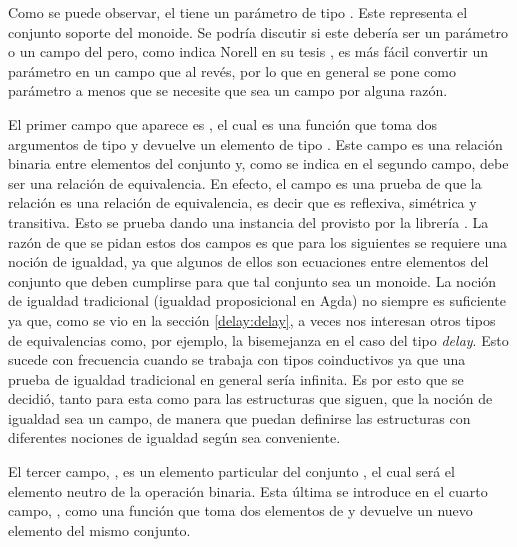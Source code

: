 
Como se puede observar, el   tiene un parámetro  de tipo . Este representa el conjunto soporte del monoide. Se podría discutir si este debería ser un parámetro o un campo del  pero, como indica Norell en su tesis \cite{norell:thesis}, es más fácil convertir un parámetro en un campo que al revés, por lo que en general se pone como parámetro a menos que se necesite que sea un campo por alguna razón.

El primer campo que aparece es , el cual es una función que toma dos argumentos de tipo  y devuelve un elemento de tipo . Este campo es una relación binaria entre elementos del conjunto  y, como se indica en el segundo campo, debe ser una relación de equivalencia. En efecto, el campo  es una prueba de que la relación  es una relación de equivalencia, es decir que es reflexiva, simétrica y transitiva. Esto se prueba dando una instancia del   provisto por la librería  \href{https://agda.github.io/agda-stdlib/Relation.Binary.Structures.html}{}. La razón de que se pidan estos dos campos es que para los siguientes se requiere una noción de igualdad, ya que algunos de ellos son ecuaciones entre elementos del conjunto  que deben cumplirse para que tal conjunto sea un monoide. La noción de igualdad tradicional (igualdad proposicional en Agda) no siempre es suficiente ya que, como se vio en la sección \ref{delay:delay}, a veces nos interesan otros tipos de equivalencias como, por ejemplo, la bisemejanza en el caso del tipo \textit{delay}. Esto sucede con frecuencia cuando se trabaja con tipos coinductivos ya que una prueba de igualdad tradicional en general sería infinita. Es por esto que se decidió, tanto para esta como para las estructuras que siguen, que la noción de igualdad sea un campo, de manera que puedan definirse las estructuras con diferentes nociones de igualdad según sea conveniente. 

El tercer campo, , es un elemento particular del conjunto , el cual será el elemento neutro de la operación binaria. Esta última se introduce en el cuarto campo, , como una función que toma dos elementos de  y devuelve un nuevo elemento del mismo conjunto. 

